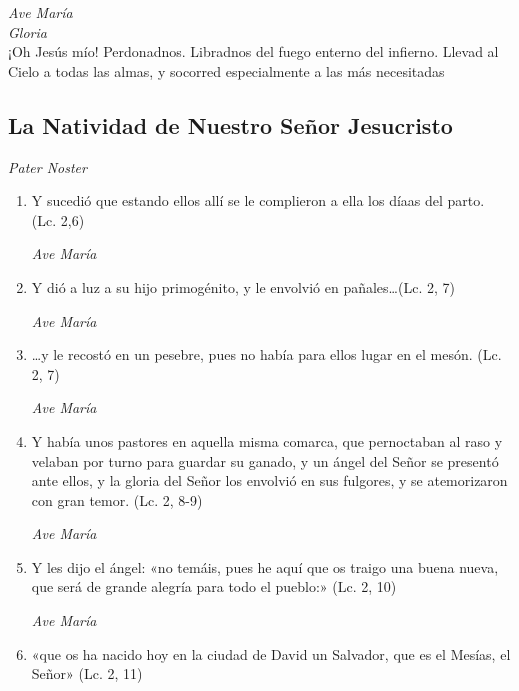 \documentclass[a4paper,11pt, oneside]{report}
\begin{document}
      \textit{Ave María} \\
      \indent\textit{Gloria} \\
      \indent¡Oh Jesús mío! Perdonadnos. Libradnos del fuego enterno del infierno. Llevad al Cielo a todas las almas, y socorred especialmente a las más 
      necesitadas
            
    \subsection*{ La Natividad de Nuestro Señor Jesucristo }
      
      \textit{Pater Noster} 

      \begin{enumerate}
        
        \item Y sucedió que estando ellos allí se le complieron a ella los díaas del parto. (Lc. 2,6)
        
        \textit{Ave María}

        \item Y dió a luz a su hijo primogénito, y le envolvió en pañales\ldots (Lc. 2, 7)
        
        \textit{Ave María}

        \item \ldots y le recostó en un pesebre, pues no había para ellos lugar en el mesón. (Lc. 2, 7)
        
        \textit{Ave María}

        \item Y había unos pastores en aquella misma comarca, que pernoctaban al raso y velaban por turno para guardar su ganado, y un ángel
        del Señor se presentó ante ellos, y la gloria del Señor los envolvió en sus fulgores, y se atemorizaron con gran temor. (Lc. 2, 8-9)
        
        \textit{Ave María}

        \item Y les dijo el ángel: «no temáis, pues he aquí que os traigo una buena nueva, que será de grande alegría para todo el pueblo:» (Lc. 2, 10)

        \textit{Ave María}

        \item «que os ha nacido hoy en la ciudad de David un Salvador, que es el Mesías, el Señor» (Lc. 2, 11)
        

\end{enumerate}
\end{document}
